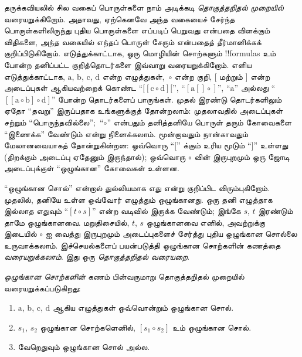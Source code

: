 \documentclass[../../../include/open-logic-section]{subfiles}
\begin{document}


தருக்கவியலில் சில வகைப் பொருள்களை நாம் அடிக்கடி
\emph{தொகுத்தறிதல் முறையில்} வரையறுக்கிறோம்.
அதாவது, ஏற்கெனவே அந்த வகையைச் சேர்ந்த
பொருள்களிலிருந்து புதிய பொருள்களை எப்படிப் பெறுவது
என்பதை விளக்கும் விதிகளை, அந்த வகையில் எந்தப்
பொருள் சேரும் என்பதைத் தீர்மானிக்கக் குறிப்பிடுகிறோம்.
எடுத்துக்காட்டாக, ஒரு மொழியின் சொற்களும்
!!{formula}s உம் போன்ற தனிப்பட்ட குறித்தொடர்களை
இவ்வாறு வரையறுக்கிறோம். எளிய எடுத்துக்காட்டாக,
$\mathrm{a}$, $\mathrm{b}$, $\mathrm{c}$,
$\mathrm{d}$ என்ற எழுத்துகள்,~$\circ$ என்ற
குறி, $[$ மற்றும் $]$ என்ற அடைப்புகள்
ஆகியவற்றைக் கொண்ட ``$[[\mathrm{c} \circ \mathrm{d}][$'',
``$[\mathrm{a}[]\circ]$'', ``$\mathrm{a}$''
அல்லது ``$[[\mathrm{a} \circ \mathrm{b}]\circ
\mathrm{d}]$'' போன்ற தொடர்களைப் பாருங்கள்.
முதல் இரண்டு தொடர்களிலும் ஏதோ ``தவறு'' இருப்பதாக
உங்களுக்குத் தோன்றலாம்: முதலாவதில் அடைப்புகள்
சற்றும் ``பொருந்தவில்லை'';~``$\circ$'' என்பதும்
தனித்தனியே பொருள் தரும் கோவைகளை ``இணைக்க''
வேண்டும் என்று நினைக்கலாம். மூன்றாவதும் நான்காவதும்
மேலானவையாகத் தோன்றுகின்றன: ஒவ்வொரு ``$[$''
க்கும் உரிய மூடும் ``$]$'' உள்ளது (திறக்கும்
அடைப்பு ஏதேனும் இருந்தால்); ஒவ்வொரு $\circ$
வின் இருபுறமும் ஒரு ஜோடி அடைப்புக்குள்
``ஒழுங்கான'' கோவைகள் உள்ளன.

``ஒழுங்கான சொல்'' என்றால் துல்லியமாக எது
என்று குறிப்பிட விரும்புகிறோம். முதலில்,
தனியே உள்ள ஒவ்வோர் எழுத்தும் ஒழுங்கானது.
ஒரு தனி எழுத்தாக இல்லாத எதுவும்
``$[t \circ s]$'' என்ற வடிவில் இருக்க வேண்டும்;
இங்கே $s$, $t$ இரண்டும் தாமே ஒழுங்கானவை.
மறுதிசையில், $t$, $s$ ஒழுங்கானவை எனில்,
அவற்றுக்கு இடையில் $\circ$ ஐ வைத்து
இருபுறமும் அடைப்புகளைச் சேர்த்து புதிய
ஒழுங்கான சொல்லை உருவாக்கலாம். இச்செயல்களைப்
பயன்படுத்தி ஒழுங்கான சொற்களின் கணத்தை
\emph{வரையறுக்கலாம்}. இது ஒரு
\emph{தொகுத்தறிதல்
  வரையறை}.

\begin{defn}[ஒழுங்கான சொற்கள்]
  \emph{ஒழுங்கான சொற்களின்} கணம் பின்வருமாறு
  தொகுத்தறிதல் முறையில் வரையறுக்கப்படுகிறது:
  \begin{enumerate}
  \item $\mathrm{a}$, $\mathrm{b}$, $\mathrm{c}$,
    $\mathrm{d}$ ஆகிய எழுத்துகள் ஒவ்வொன்றும்
    ஒழுங்கான சொல்.
  \item $s_1$, $s_2$ ஒழுங்கான சொற்களெனில்,
    $[s_1 \circ s_2]$ உம் ஒழுங்கான சொல்.
  \item வேறெதுவும் ஒழுங்கான சொல் அல்ல.
  \end{enumerate}
\end{defn}
\end{document}

